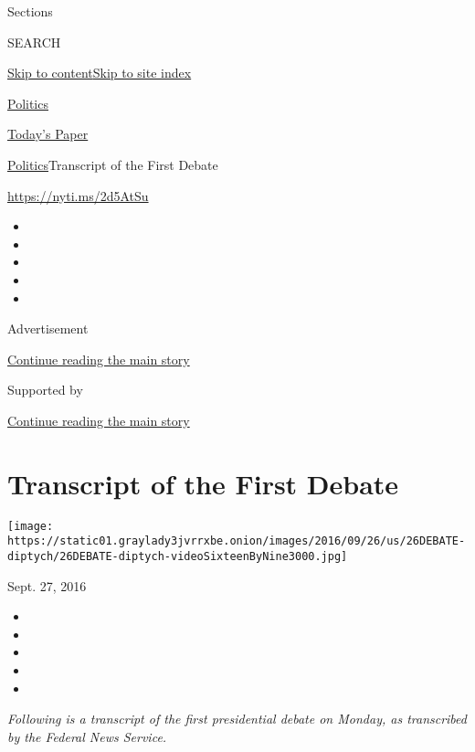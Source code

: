 Sections

SEARCH

\protect\hyperlink{site-content}{Skip to
content}\protect\hyperlink{site-index}{Skip to site index}

\href{https://www.nytimes3xbfgragh.onion/section/politics}{Politics}

\href{https://myaccount.nytimes3xbfgragh.onion/auth/login?response_type=cookie\&client_id=vi}{}

\href{https://www.nytimes3xbfgragh.onion/section/todayspaper}{Today's
Paper}

\href{/section/politics}{Politics}\textbar{}Transcript of the First
Debate

\url{https://nyti.ms/2d5AtSu}

\begin{itemize}
\item
\item
\item
\item
\item
\end{itemize}

Advertisement

\protect\hyperlink{after-top}{Continue reading the main story}

Supported by

\protect\hyperlink{after-sponsor}{Continue reading the main story}

\hypertarget{transcript-of-the-first-debate}{%
\section{Transcript of the First
Debate}\label{transcript-of-the-first-debate}}

\texttt{[image: https://static01.graylady3jvrrxbe.onion/images/2016/09/26/us/26DEBATE-diptych/26DEBATE-diptych-videoSixteenByNine3000.jpg]}

Sept. 27, 2016

\begin{itemize}
\item
\item
\item
\item
\item
\end{itemize}

\emph{Following is a transcript of the first presidential debate on
Monday, as transcribed by the Federal News Service.}

